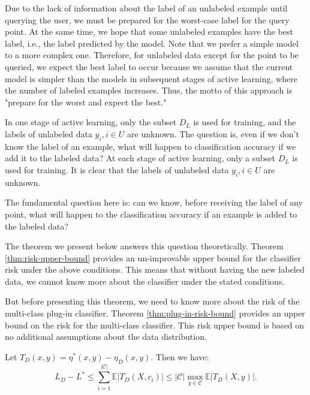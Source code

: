 	Due to the lack of information about the label of an unlabeled example until querying the user, we must be prepared for the worst-case label for the query point. At the same time, we hope that some unlabeled examples have the best label, i.e., the label predicted by the model. Note that we prefer a simple model to a more complex one. Therefore, for unlabeled data except for the point to be queried, we expect the best label to occur because we assume that the current model is simpler than the models in subsequent stages of active learning, where the number of labeled examples increases. Thus, the motto of this approach is "prepare for the worst and expect the best."
	
	In one stage of active learning, only the subset $D_L$ is used for training, and the labels of unlabeled data $y_i, i \in U$ are unknown. The question is, even if we don't know the label of an example, what will happen to classification accuracy if we add it to the labeled data? At each stage of active learning, only a subset $D_L$ is used for training. It is clear that the labels of unlabeled data $y_i, i \in U$ are unknown.
	
	The fundamental question here is: can we know, before receiving the label of any point, what will happen to the classification accuracy if an example is added to the labeled data?
	
	The theorem we present below answers this question theoretically. Theorem \ref{thm:risk-upper-bound} provides an un-improvable upper bound for the classifier risk under the above conditions. This means that without having the new labeled data, we cannot know more about the classifier under the stated conditions.
	
	But before presenting this theorem, we need to know more about the risk of the multi-class plug-in classifier. Theorem \ref{thm:plug-in-risk-bound} provides an upper bound on the risk for the multi-class classifier. This risk upper bound is based on no additional assumptions about the data distribution.
	
	\begin{theorem}
		\label{thm:plug-in-risk-bound}
		Let $T_D(x, y) = \eta^*(x, y) - \eta_D(x, y)$. Then we have:
		\begin{equation}
			L_D - L^* \le \sum_{i=1}^{|\mathcal{C}|} \mathbb{E}|T_D(X, c_i)| \le |\mathcal{C}| \max_{y \in \mathcal{C}} \mathbb{E}|T_D(X, y)|.
		\end{equation}
	\end{theorem}
	
